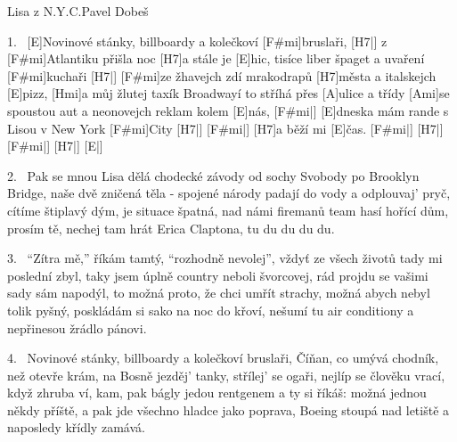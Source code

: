 \begin{song}{Lisa z N.Y.C.}{Pavel Dobeš}

\begin{xverse}{1.~}
[\large E]Novinové stánky, billboardy a kolečkoví [\large F#mi]bruslaři, [\large H7|]{}
z [\large F#mi]Atlantiku přišla noc [\large H7]a stále je [\large E]hic,
tisíce liber špaget a uvaření [\large F#mi]kuchaři [\large H7|]{}
[\large F#mi]ze žhavejch zdí mrakodrapů [\large H7]města a italskejch [\large E]pizz,
[\large Hmi]a můj žlutej taxík Broadwayí to stříhá přes [\large A]ulice a třídy
[\large Ami]se spoustou aut a neonovejch reklam kolem [\large E]nás, [\large F#mi|]{}
[\large E]dneska mám rande s Lisou v New York [\large F#mi]City [\large H7|]{}
[\large F#mi|]{} [\large H7]a běží mi [\large E]{čas}. [\large F#mi|]{} [\large H7|]{} [\large F#mi|]{} [\large H7|]{} [\large E|]{}
\end{xverse}

\begin{xverse}{2.~}
Pak se mnou Lisa dělá chodecké závody
od sochy Svobody po Brooklyn Bridge,
naše dvě zničená těla - spojené národy
padají do vody a odplouvaj' pryč,
cítíme štiplavý dým, je situace špatná,
nad námi firemanů team hasí hořící dům,
prosím tě, nechej tam hrát Erica Claptona,
tu du du du du.
\end{xverse}

\begin{xverse}{3.~}
``Zítra mě,'' říkám tamtý, ``rozhodně nevolej'',
vždyť ze všech životů tady mi poslední zbyl,
taky jsem úplně country neboli švorcovej,
rád projdu se vašimi sady sám napodýl,
to možná proto, že chci umřít strachy,
možná abych nebyl tolik pyšný,
poskládám si sako na noc do křoví,
nešumí tu air conditiony
a nepřinesou žrádlo pánovi.
\end{xverse}

\begin{xverse}{4.~}
Novinové stánky, billboardy a kolečkoví bruslaři,
Číňan, co umývá chodník, než otevře krám,
na Bosně jezděj' tanky, střílej' se ogaři,
nejlíp se člověku vrací, když zhruba ví, kam,
pak bágly jedou rentgenem a ty si říkáš:
možná jednou někdy příště,
a pak jde všechno hladce jako poprava,
Boeing stoupá nad letiště
a naposledy křídly zamává.
\end{xverse}

\end{song}


